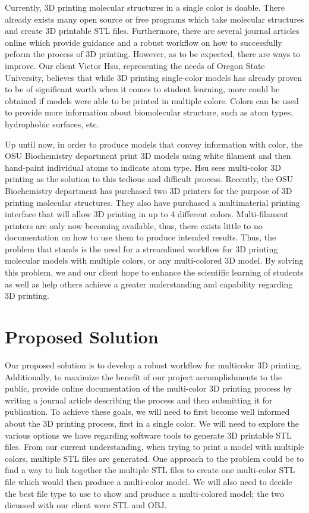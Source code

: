 \documentclass[onecolumn, draftclsnofoot,10pt, compsoc]{IEEEtran}
\begin{document}
Currently, 3D printing molecular structures in a single color is doable. 
There already exists many open source or free programs which take molecular structures and create 3D printable STL files.
Furthermore, there are several journal articles online which provide guidance and a robust workflow on how to successfully peform the process of 3D printing.  
However, as to be expected, there are ways to improve. 
Our client Victor Hsu, representing the needs of Oregon State University, believes that while 3D printing single-color models has already proven to be of significant worth when it comes to student learning, more could be obtained if models were able to be printed in multiple colors. 
Colors can be used to provide more information about biomolecular structure, such as atom types, hydrophobic surfaces, etc. 

Up until now, in order to produce models that convey information with color, the OSU Biochemistry department print 3D models using white filament and then hand-paint individual atoms to indicate atom type. 
Hsu sees multi-color 3D printing as the solution to this tedious and difficult process.
Recently, the OSU Biochemistry department has purchased two 3D printers for the purpose of 3D printing molecular structures. 
They also have purchased a multimaterial printing interface that will allow 3D printing in up to 4 different colors. 
Multi-filament printers are only now becoming available, thus, there exists little to no documentation on how to use them to produce intended results. 
Thus, the problem that stands is the need for a streamlined workflow for 3D printing molecular models with multiple colors, or any multi-colored 3D model.
By solving this problem, we and our client hope to enhance the scientific learning of students as well as help others achieve a greater understanding and capability regarding 3D printing. 

\section{Proposed Solution}
Our proposed solution is to develop a robust workflow for multicolor 3D printing. 
Additionally, to maximize the benefit of our project accomplishments to the public, provide online documentation of the multi-color 3D printing process by writing a journal article describing the process and then submitting it for publication. 
To achieve these goals, we will need to first become well informed about the 3D printing process, first in a single color. 
We will need to explore the various options we have regarding software tools to generate 3D printable STL files.
From our current understanding, when trying to print a model with multiple colors, multiple STL files are generated.
One approach to the problem could be to find a way to link together the multiple STL files to create one multi-color STL file which would then produce a multi-color model.
We will also need to decide the best file type to use to show and produce a multi-colored model; the two dicussed with our client were STL and OBJ. 
\end{document}
